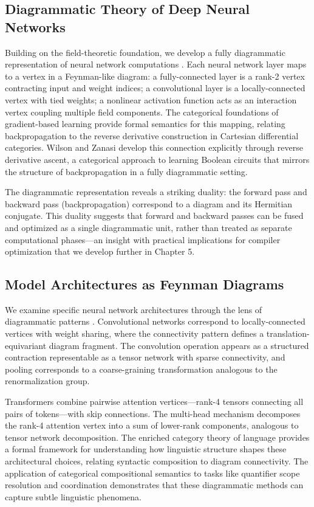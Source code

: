 \documentclass[12pt,a4paper]{article}
\begin{document}
\subsection{Diagrammatic Theory of Deep Neural Networks}

Building on the field-theoretic foundation, we develop a fully diagrammatic representation of neural network computations \cite{crescenzi2024towards}. Each neural network layer maps to a vertex in a Feynman-like diagram: a fully-connected layer is a rank-2 vertex contracting input and weight indices; a convolutional layer is a locally-connected vertex with tied weights; a nonlinear activation function acts as an interaction vertex coupling multiple field components. The categorical foundations of gradient-based learning \cite{cruttwell2022categorical} provide formal semantics for this mapping, relating backpropagation to the reverse derivative construction in Cartesian differential categories. Wilson and Zanasi \cite{wilson2021reverse} develop this connection explicitly through reverse derivative ascent, a categorical approach to learning Boolean circuits that mirrors the structure of backpropagation in a fully diagrammatic setting.

The diagrammatic representation reveals a striking duality: the forward pass and backward pass (backpropagation) correspond to a diagram and its Hermitian conjugate. This duality suggests that forward and backward passes can be fused and optimized as a single diagrammatic unit, rather than treated as separate computational phases---an insight with practical implications for compiler optimization that we develop further in Chapter 5.

\subsection{Model Architectures as Feynman Diagrams}

We examine specific neural network architectures through the lens of diagrammatic patterns \cite{abbott2024neural}. Convolutional networks correspond to locally-connected vertices with weight sharing, where the connectivity pattern defines a translation-equivariant diagram fragment. The convolution operation appears as a structured contraction representable as a tensor network with sparse connectivity, and pooling corresponds to a coarse-graining transformation analogous to the renormalization group.

Transformers combine pairwise attention vertices---rank-4 tensors connecting all pairs of tokens---with skip connections. The multi-head mechanism decomposes the rank-4 attention vertex into a sum of lower-rank components, analogous to tensor network decomposition. The enriched category theory of language \cite{bradley2022an} provides a formal framework for understanding how linguistic structure shapes these architectural choices, relating syntactic composition to diagram connectivity. The application of categorical compositional semantics to tasks like quantifier scope resolution \cite{sadrzadeh2016quantifier} and coordination \cite{kartsaklis2016coordination} demonstrates that these diagrammatic methods can capture subtle linguistic phenomena.
\end{document}

